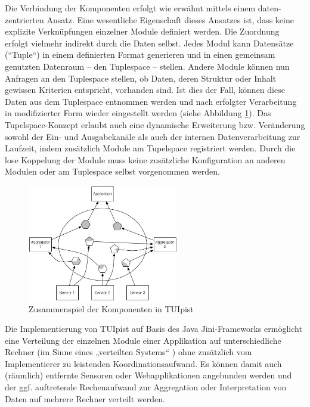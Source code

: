 Die Verbindung der Komponenten erfolgt wie erwähnt mittels einem daten-zentrierten Ansatz. Eine wesentliche Eigenschaft dieses Ansatzes ist, dass keine explizite Verknüpfungen einzelner Module definiert werden. Die Zuordnung erfolgt vielmehr indirekt durch die Daten selbst. Jedes Modul kann Datensätze (“Tuple“) in einem definierten Format generieren und in einen gemeinsam genutzten Datenraum -- den Tuplespace -- stellen. Andere Module können nun Anfragen an den Tuplespace stellen, ob Daten, deren Struktur oder Inhalt gewissen Kriterien entspricht, vorhanden sind. Ist dies der Fall, können diese Daten aus dem Tuplespace entnommen werden und nach erfolgter Verarbeitung in modifizierter Form wieder eingestellt werden (siehe Abbildung \ref{fig:img_ImplementierungInput_TUIpistOperation}). Das Tupelspace-Konzept erlaubt auch eine dynamische Erweiterung bzw. Veränderung sowohl der Ein- und Ausgabekanäle als auch der internen Datenverarbeitung zur Laufzeit, indem zusätzlich Module am Tupelspace registriert werden. Durch die lose Koppelung der Module muss keine zusätzliche Konfiguration an anderen Modulen oder am Tuplespace selbst vorgenommen werden.

\begin{figure}[htbp]
	\centering
		\includegraphics[height=2in]{img/ImplementierungInput/TUIpistOperation.jpg}
	\caption{Zusammenspiel der Komponenten in TUIpist \citep{Furtmuller07a}}
	\label{fig:img_ImplementierungInput_TUIpistOperation}
\end{figure}

Die Implementierung von TUIpist auf Basis des Java Jini-Frameworks \citep{Arnold99} ermöglicht eine Verteilung der einzelnen Module einer Applikation auf unterschiedliche Rechner (im Sinne eines „verteilten Systems“ \citep{Stary94}) ohne zusätzlich vom Implementierer zu leistenden Koordinationsaufwand. Es können damit auch (räumlich) entfernte Sensoren oder Webapplikationen angebunden werden und der ggf. auftretende Rechenaufwand zur Aggregation oder Interpretation von Daten auf mehrere Rechner verteilt werden.

